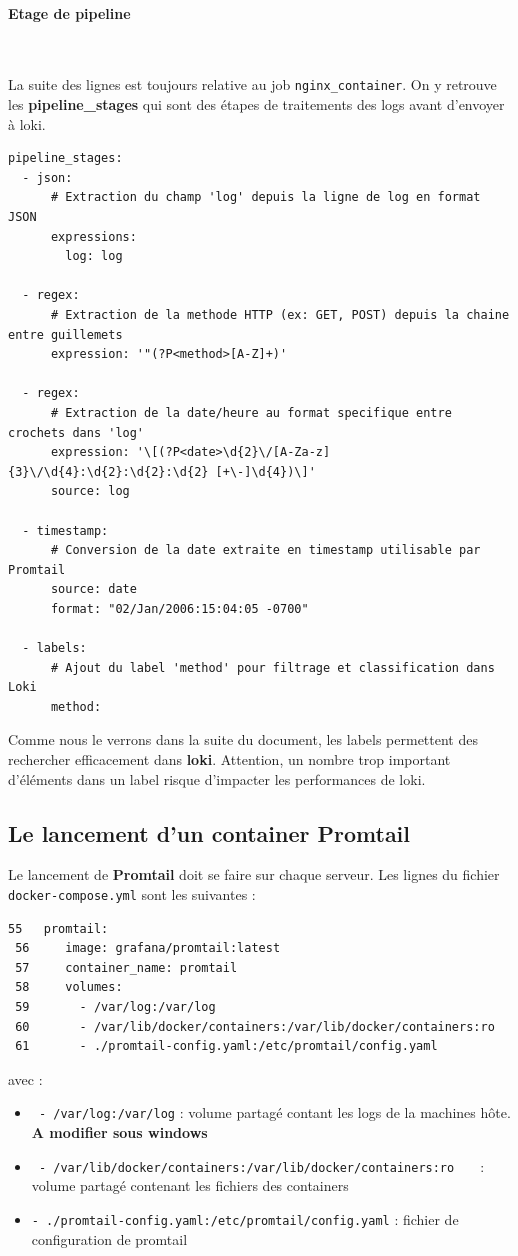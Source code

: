 \documentclass[french, 12pt]{article}%
\newcommand{\itemE}{\item[$\bullet$]}
\begin{document}
\paragraph{Etage de pipeline}\ 

La suite des lignes est toujours relative au job \verb?nginx_container?. On y retrouve les \textbf{pipeline\_stages} qui sont des étapes de traitements des logs avant d'envoyer à loki. 


\begin{lstlisting}[style=commande]
    pipeline_stages:
  - json:
      # Extraction du champ 'log' depuis la ligne de log en format JSON
      expressions:
        log: log

  - regex:
      # Extraction de la methode HTTP (ex: GET, POST) depuis la chaine entre guillemets
      expression: '"(?P<method>[A-Z]+)'

  - regex:
      # Extraction de la date/heure au format specifique entre crochets dans 'log'
      expression: '\[(?P<date>\d{2}\/[A-Za-z]{3}\/\d{4}:\d{2}:\d{2}:\d{2} [+\-]\d{4})\]'
      source: log

  - timestamp:
      # Conversion de la date extraite en timestamp utilisable par Promtail
      source: date
      format: "02/Jan/2006:15:04:05 -0700"

  - labels:
      # Ajout du label 'method' pour filtrage et classification dans Loki
      method:
\end{lstlisting}


Comme nous le verrons dans la suite du document, les labels permettent des rechercher efficacement dans \textbf{loki}. Attention, un nombre trop important d'éléments dans un label risque d'impacter les performances de loki. 



\subsection{Le lancement d'un container Promtail}
 Le lancement de \textbf{Promtail} doit se faire sur chaque serveur. Les lignes du fichier \verb?docker-compose.yml? sont les suivantes : 

\begin{lstlisting}[style=commande]
 55   promtail:
 56     image: grafana/promtail:latest
 57     container_name: promtail
 58     volumes:
 59       - /var/log:/var/log
 60       - /var/lib/docker/containers:/var/lib/docker/containers:ro        
 61       - ./promtail-config.yaml:/etc/promtail/config.yaml
\end{lstlisting}
avec : 
\begin{itemize}
\itemE \verb? - /var/log:/var/log? : volume partagé contant les logs de la machines hôte. \textbf{A modifier sous windows}
\itemE \verb? - /var/lib/docker/containers:/var/lib/docker/containers:ro   ? : volume partagé contenant les fichiers des containers
\itemE \verb?- ./promtail-config.yaml:/etc/promtail/config.yaml?  : fichier de configuration de promtail
\end{itemize}
\end{document}
